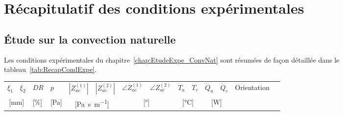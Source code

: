 \chapter{Récapitulatif des conditions expérimentales}
\section{\'Etude sur la convection naturelle}
Les conditions expérimentales du chapitre~\ref{chap:EtudeExpe_ConvNat} sont résumées de façon détaillée dans le tableau~\ref{tab:RecapCondExpe}.

\begin{table}[!ht]
\centering
	\begin{tabular}{ llll llll llll lc}
	\hline
	$\xi_1$ & $\xi_2$  & $DR$ & $p$ & $|Z_{ac}^{(1)}|$ & $|Z_{ac}^{(2)}|$& $\angle Z_{ac}^{(1)}$  & $\angle Z_{ac}^{(2)}$ & $T_a$  & $T_c$ & $\dot Q_a$ & $\dot Q_c$  & \multirow{2}{*}{Orientation} \\%
	
	\multicolumn{2}{c}{[\unit{\milli\meter}]} & [\unit{\percent}] & [\unit{\pascal}] & \multicolumn{2}{c}{[\unit{\pascal\second\per\meter}]} & \multicolumn{2}{c}{[\unit{\degree}]}  & \multicolumn{2}{c}{[\unit{\degreeCelsius}]} &\multicolumn{2}{c}{[\unit{\watt}]} &  \\\hline\hline
	

\end{tabular}
\end{table}
